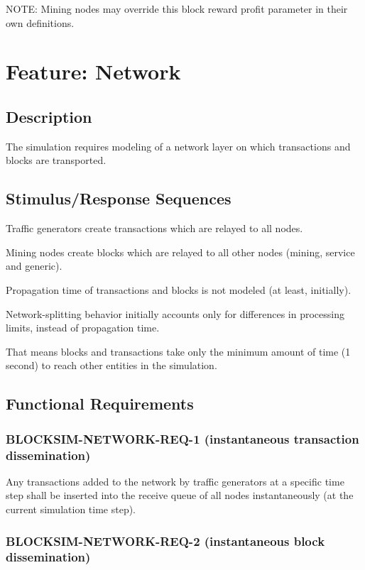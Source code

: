 \documentclass{scrreprt}
\begin{document}
        NOTE: Mining nodes may override this block reward profit parameter
        in their own definitions.

  \section{Feature: Network}

    \subsection{Description}

      The simulation requires modeling of a network layer on which
      transactions and blocks are transported.

    \subsection{Stimulus/Response Sequences}

      Traffic generators create transactions which are relayed to all nodes.

      Mining nodes create blocks which are relayed to all other nodes (mining,
      service and generic).

      Propagation time of transactions and blocks is not modeled (at least,
      initially).

      Network-splitting behavior initially accounts only for differences in
      processing limits, instead of propagation time.

      That means blocks and transactions take only the minimum amount of time
      (1 second) to reach other entities in the simulation.

    \subsection{Functional Requirements}

      \subsubsection{BLOCKSIM-NETWORK-REQ-1 (instantaneous transaction dissemination)}

        Any transactions added to the network by traffic generators at a
        specific time step shall be inserted into the receive queue of all
        nodes instantaneously (at the current simulation time step).

      \subsubsection{BLOCKSIM-NETWORK-REQ-2 (instantaneous block dissemination)}
\end{document}
